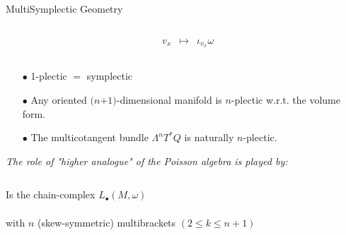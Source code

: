 \documentclass[final,a0paper,20pt,
						pdftex,
            pdfauthor={Antonio Michele Miti},
            pdftitle={Homotopy title},
            pdfsubject={Poster for the conference Super19 in Luxembourg},
            pdfkeywords={Some Keywords},
            pdfproducer={Latex with hyperref, or other system},
            pdfcreator={pdflatex, or other tool}
            ]{beamer}
\newcommand{\pinned}[1]{
    \faThumbTack 
    \hfill
    #1
    \hfill \faThumbTack
    \\
    }
\begin{document}
\begin{frame}[t]
\begin{columns}[t]
\begin{column}{\onecolwid}
\begin{block}{\pinned{MultiSymplectic Geometry}}
\begin{columns}[T]
\begin{column}{.35\linewidth}
\begin{defblock}
\begin{alignat*}{2}
			 			 & v_x &\longmapsto&  \iota_{v_x}\omega		
					\end{alignat*}				
				\end{defblock}
			\end{column}
		\end{columns}
		\begin{itemize}
			\item[$\bullet$] 1-plectic $=$ symplectic
			\item[$\bullet$] Any oriented $(n$+$1)$-dimensional manifold is $n$-plectic w.r.t. the volume form.
			\item[$\bullet$] The multicotangent bundle $\Lambda^n T^\ast Q$ is naturally $n$-plectic.
		\end{itemize}
		\vspace{0.5em}
		\centering
		\parbox{0.98\linewidth}{%
		\emph{
			The role of  "\emph{higher analogue}" of the \emph{Poisson algebra} is played by: %
		}
		}		
		\begin{defblock}
			\begin{columns}
				\hfill
				\begin{column}{.95\linewidth}		
					Is the chain-complex $L_\bullet(M,\omega)$
					\\
					\quad
					\\
					with $n$ (skew-symmetric) multibrackets $(2 \leq k \leq n+1)$\\
					\quad
				\end{column}
			\end{columns}
		\end{defblock}

	\end{block}


\end{column}
\end{columns}
\end{frame}
\end{document}
